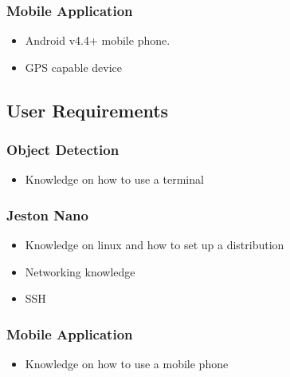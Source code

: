 \subsubsection{Mobile Application} 
\begin{itemize}
		\item Android v4.4+ mobile phone.
		\item GPS capable device
\end{itemize}

\subsection{User Requirements}
\subsubsection{Object Detection}
\begin{itemize}
    \item Knowledge on how to use a terminal
\end{itemize}
\subsubsection{Jeston Nano}
\begin{itemize}
    \item Knowledge on linux and how to set up a distribution
    \item Networking knowledge
    \item SSH
\end{itemize}
\subsubsection{Mobile Application}
\begin{itemize}
    \item Knowledge on how to use a mobile phone
\end{itemize}
